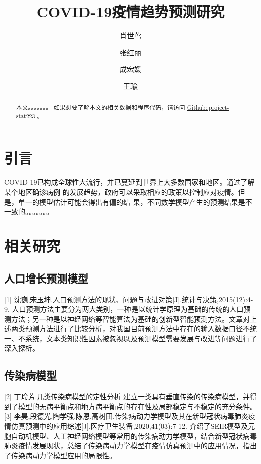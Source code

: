 \documentclass[lang=cn,11pt,a4paper,cite=authoryear]{elegantpaper}
\title{COVID-19疫情趋势预测研究}
\author{肖世莺 \and 张红丽 \and 成宏媛 \and 王瑜}
\date{}
\begin{document}
\maketitle

\begin{abstract}
本文。。。。。。。
如果想要了解本文的相关数据和程序代码，请访问
\href{https://github.com/data-science-in-action/project-stat223}{Github::project-stat223}
。
\end{abstract}

\section{引言}
COVID-19已构成全球性大流行，并已蔓延到世界上大多数国家和地区。通过了解某个地区确诊病例
的发展趋势，政府可以采取相应的政策以控制应对疫情。但是，单一的模型估计可能会得出有偏的结
果，不同数学模型产生的预测结果是不一致的。。。。。。。

\section{相关研究}

\subsection{人口增长预测模型}

[1] 沈巍,宋玉坤.人口预测方法的现状、问题与改进对策[J].统计与决策,2015(12):4-9.
人口预测方法主要分为两大类别，一种是以统计学原理为基础的传统的人口预测方法；另一种是以神经网络等智能算法为基础的创新型智能预测方法。文章对上述两类预测方法进行了比较分析，对我国目前预测方法中存在的输入数据口径不统一、不系统，文本类知识性因素被忽视以及预测模型需要发展与改进等问题进行了深入探析。

\subsection{传染病模型}

[2] 丁玲芳.几类传染病模型的定性分析
建立一类具有垂直传染的传染病模型，并得到了模型的无病平衡点和地方病平衡点的存在性及局部稳定与不稳定的充分条件。
[3] 李昊,段德光,陶学强,陈恩,高树田.传染病动力学模型及其在新型冠状病毒肺炎疫情仿真预测中的应用综述[J].医疗卫生装备,2020,41(03):7-12.
介绍了SEIR模型及元胞自动机模型、人工神经网络模型等常用的传染病动力学模型，结合新型冠状病毒肺炎疫情发展现状，总结了传染病动力学模型在疫情仿真预测中的应用情况，指出了传染病动力学模型应用的局限性。
\end{document}
